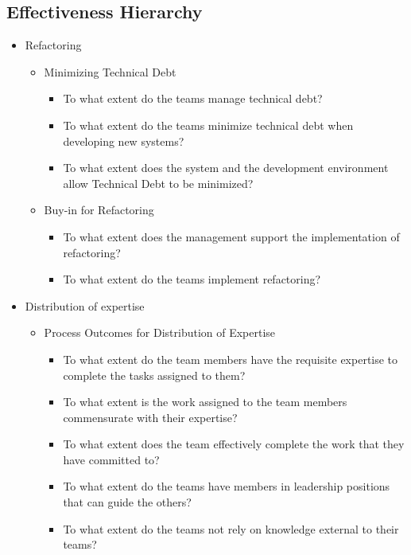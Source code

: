 \begin{appendices}
\section{Effectiveness Hierarchy} \label{sec:effectiveness_hierarchy}

\begin{itemize}
	\item Refactoring 
		\begin{itemize}
			\item Minimizing Technical Debt 
				\begin{itemize}
					\item To what extent do the teams manage technical debt? 
					\item To what extent do the teams minimize technical debt when developing new systems? 
					\item To what extent does the system and the development environment allow Technical Debt to be minimized? 
				\end{itemize}
			\item Buy-in for Refactoring 
				\begin{itemize}
					\item To what extent does the management support the implementation of refactoring? 
					\item To what extent do the teams implement refactoring? 
				\end{itemize}
		\end{itemize}
	\item Distribution of expertise 
		\begin{itemize}
			\item Process Outcomes for Distribution of Expertise
				\begin{itemize}
					\item To what extent do the team members have the requisite expertise to complete the tasks assigned to them? 
					\item To what extent is the work assigned to the team members commensurate with their expertise? 
					\item To what extent does the team effectively complete the work that they have committed to? 
					\item To what extent do the teams have members in leadership positions that can guide the others? 
					\item To what extent do the teams not rely on knowledge external to their teams? 
				\end{itemize}

\end{itemize}
\end{itemize}
\end{appendices}
